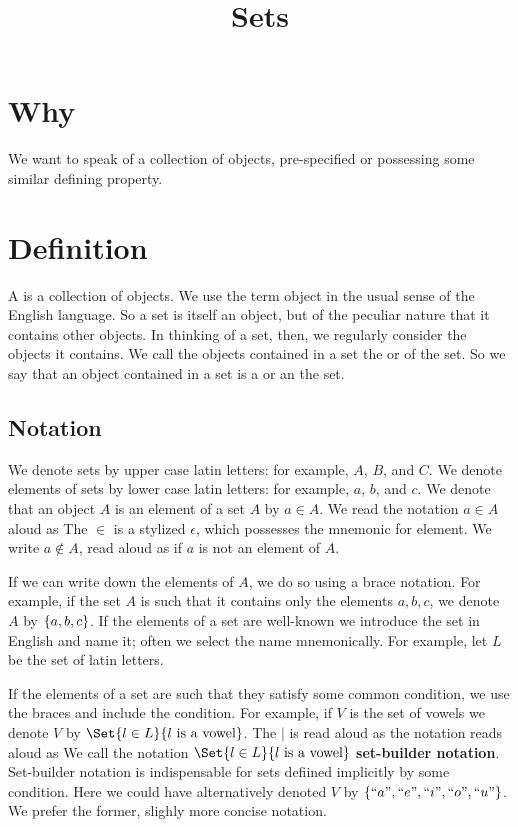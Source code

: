 





\title{Sets}

\section{Why}

We want to speak of a collection of objects, pre-specified or possessing some similar defining property.

\section{Definition}

A  is a collection of objects.
We use the term object in the usual sense of the English language.
So a set is itself an object, but of the peculiar nature that it contains other objects.
In thinking of a set, then, we regularly consider the objects it contains.
We call the objects contained in a set the  or  of the set.
So we say that an object contained in a set is a  or an  the set.

\subsection{Notation}

We denote sets by upper case latin letters: for example, $A$, $B$, and $C$.
We denote elements of sets by lower case latin letters: for example, $a$, $b$, and $c$.
We denote that an object $A$ is an element of a set $A$ by $a \in A$.
We read the notation $a \in A$ aloud as 
The $\in$ is a stylized $\epsilon$, which possesses the mnemonic for element.
We write $a \not\in A$, read aloud as  if $a$ is not an element of $A$.

If we can write down the elements of $A$, we do so using a brace notation.
For example, if the set $A$ is such that it contains only the elements $a, b, c$, we denote $A$ by $\{a, b, c\}$.
If the elements of a set are well-known we introduce the set in English and name it; often we select the name mnemonically.
For example, let $L$ be the set of latin letters.

If the elements of a set are such that they satisfy some common condition, we use the braces and include the condition.
For example, if $V$ is the set of vowels we denote $V$ by $\Set{l \in L}{l \text{ is a vowel}}$.
The $\mid$ is read aloud as  the notation reads aloud as 
We call the notation $\Set{l \in L}{l \text{ is a vowel}}$ \textbf{set-builder notation}.
Set-builder notation is indispensable for sets defiined implicitly by some condition.
Here we could have alternatively denoted $V$ by $\{``a",``e",``i",``o",``u"\}$.
We prefer the former, slighly more concise notation.

